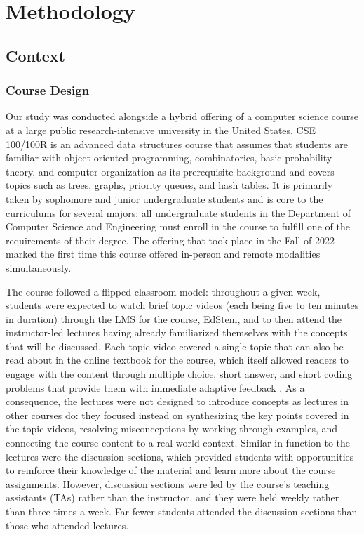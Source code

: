 \chapter{Methodology}

\section{Context}

\subsection{Course Design}

Our study was conducted alongside a hybrid offering of a computer science course at a large public research-intensive university in the United States. CSE 100/100R is an advanced data structures course that assumes that students are familiar with object-oriented programming, combinatorics, basic probability theory, and computer organization as its prerequisite background and covers topics such as trees, graphs, priority queues, and hash tables. It is primarily taken by sophomore and junior undergraduate students and is core to the curriculums for several majors: all undergraduate students in the Department of Computer Science and Engineering must enroll in the course to fulfill one of the requirements of their degree. The offering that took place in the Fall of 2022 marked the first time this course offered in-person and remote modalities simultaneously.

The course followed a flipped classroom model: throughout a given week, students were expected to watch brief topic videos (each being five to ten minutes in duration) through the LMS for the course, EdStem, and to then attend the instructor-led lectures having already familiarized themselves with the concepts that will be discussed. Each topic video covered a single topic that can also be read about in the online textbook for the course, which itself allowed readers to engage with the content through multiple choice, short answer, and short coding problems that provide them with immediate adaptive feedback \cite{moshiri2016data}. As a consequence, the lectures were not designed to introduce concepts as lectures in other courses do: they focused instead on synthesizing the key points covered in the topic videos, resolving misconceptions by working through examples, and connecting the course content to a real-world context. Similar in function to the lectures were the discussion sections, which provided students with opportunities to reinforce their knowledge of the material and learn more about the course assignments. However, discussion sections were led by the course's teaching assistants (TAs) rather than the instructor, and they were held weekly rather than three times a week. Far fewer students attended the discussion sections than those who attended lectures.

